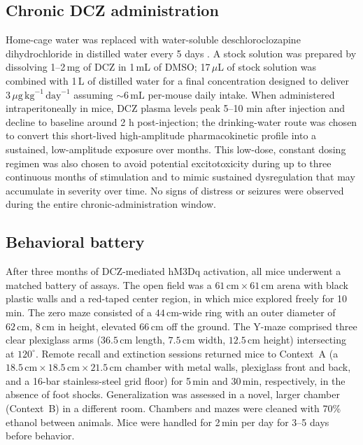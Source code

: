 \documentclass[11pt]{article}
\begin{document}
\subsection{Chronic DCZ administration}
Home-cage water was replaced with water-soluble deschloroclozapine dihydrochloride in distilled water every 5 days \citep{nagai2020dcz,roth2016dreadds}. A stock solution was prepared by dissolving 1--2\,mg of DCZ in 1\,mL of DMSO; 17\,$\mu$L of stock solution was combined with 1\,L of distilled water for a final concentration designed to deliver $3\,\mu\mathrm{g}\,\mathrm{kg}^{-1}\,\mathrm{day}^{-1}$ assuming $\sim\!6\,\mathrm{mL}$ per-mouse daily intake. When administered intraperitoneally in mice, DCZ plasma levels peak 5--10 min after injection and decline to baseline around 2 h post-injection; the drinking-water route was chosen to convert this short-lived high-amplitude pharmacokinetic profile into a sustained, low-amplitude exposure over months. This low-dose, constant dosing regimen was also chosen to avoid potential excitotoxicity during up to three continuous months of stimulation and to mimic sustained dysregulation that may accumulate in severity over time. No signs of distress or seizures were observed during the entire chronic-administration window.

\subsection{Behavioral battery}
After three months of DCZ-mediated hM3Dq activation, all mice underwent a matched battery of assays. The open field was a $61\,\mathrm{cm}\times 61\,\mathrm{cm}$ arena with black plastic walls and a red-taped center region, in which mice explored freely for 10\,min. The zero maze consisted of a $44\,\mathrm{cm}$-wide ring with an outer diameter of $62\,\mathrm{cm}$, $8\,\mathrm{cm}$ in height, elevated $66\,\mathrm{cm}$ off the ground. The Y-maze comprised three clear plexiglass arms ($36.5\,\mathrm{cm}$ length, $7.5\,\mathrm{cm}$ width, $12.5\,\mathrm{cm}$ height) intersecting at $120^{\circ}$. Remote recall and extinction sessions returned mice to Context~A (a $18.5\,\mathrm{cm}\times 18.5\,\mathrm{cm}\times 21.5\,\mathrm{cm}$ chamber with metal walls, plexiglass front and back, and a 16-bar stainless-steel grid floor) for 5\,min and 30\,min, respectively, in the absence of foot shocks. Generalization was assessed in a novel, larger chamber (Context~B) in a different room. Chambers and mazes were cleaned with 70\% ethanol between animals. Mice were handled for 2\,min per day for 3--5 days before behavior.
\end{document}

